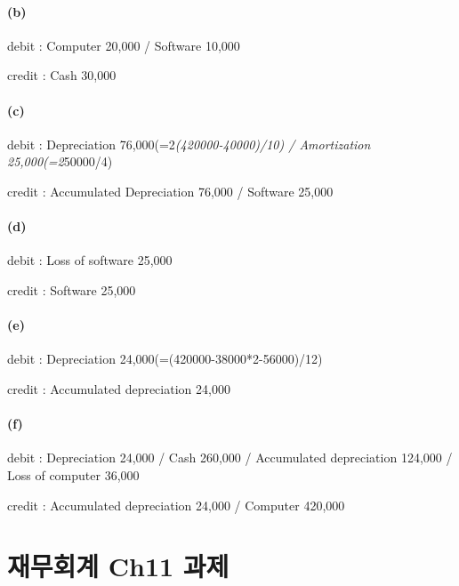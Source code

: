 \documentclass[
  a4paper,
  DIV=11,
  numbers=noendperiod]{scrreprt}
\begin{document}
\subsubsection*{(b)}\label{b-1}

debit : Computer 20,000 / Software 10,000

credit : Cash 30,000

\subsubsection*{(c)}\label{c}

debit : Depreciation 76,000(=2\emph{(420000-40000)/10) / Amortization
25,000(=2}50000/4)

credit : Accumulated Depreciation 76,000 / Software 25,000

\subsubsection*{(d)}\label{d}

debit : Loss of software 25,000

credit : Software 25,000

\subsubsection*{(e)}\label{e}

debit : Depreciation 24,000(=(420000-38000*2-56000)/12)

credit : Accumulated depreciation 24,000

\subsubsection*{(f)}\label{f}

debit : Depreciation 24,000 / Cash 260,000 / Accumulated depreciation
124,000 / Loss of computer 36,000

credit : Accumulated depreciation 24,000 / Computer 420,000

\chapter*{재무회계 Ch11
과제}\label{uxc7acuxbb34uxd68cuxacc4-ch11-uxacfcuxc81c}
\end{document}

